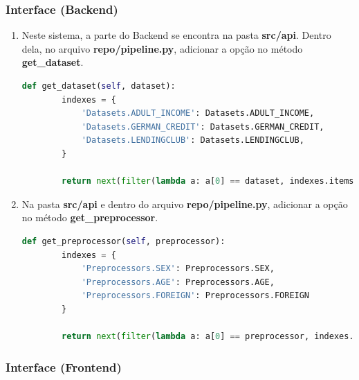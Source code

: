 \documentclass[Portugues,Final]{ic-tese-v3}
\begin{document}
\subsubsection{Interface (Backend)}

\begin{enumerate}
\item Neste sistema, a parte do Backend se encontra na pasta \textbf{src/api}. Dentro dela, no arquivo \textbf{repo/pipeline.py}, adicionar a opção no método \textbf{get\_dataset}.

\begin{lstlisting}[language=Python, label=cod:AddDataset]
    def get_dataset(self, dataset):
        indexes = {
            'Datasets.ADULT_INCOME': Datasets.ADULT_INCOME,
            'Datasets.GERMAN_CREDIT': Datasets.GERMAN_CREDIT,
            'Datasets.LENDINGCLUB': Datasets.LENDINGCLUB,
        }

        return next(filter(lambda a: a[0] == dataset, indexes.items()))[1]
\end{lstlisting}

\item Na pasta \textbf{src/api} e dentro do arquivo \textbf{repo/pipeline.py}, adicionar a opção no método \textbf{get\_preprocessor}.

\begin{lstlisting}[language=Python, label=cod:AddDataset]
    def get_preprocessor(self, preprocessor):
        indexes = {
            'Preprocessors.SEX': Preprocessors.SEX,
            'Preprocessors.AGE': Preprocessors.AGE,
            'Preprocessors.FOREIGN': Preprocessors.FOREIGN
        }

        return next(filter(lambda a: a[0] == preprocessor, indexes.items()))[1]
\end{lstlisting}
\end{enumerate}

\subsubsection{Interface (Frontend)}
\end{document}

